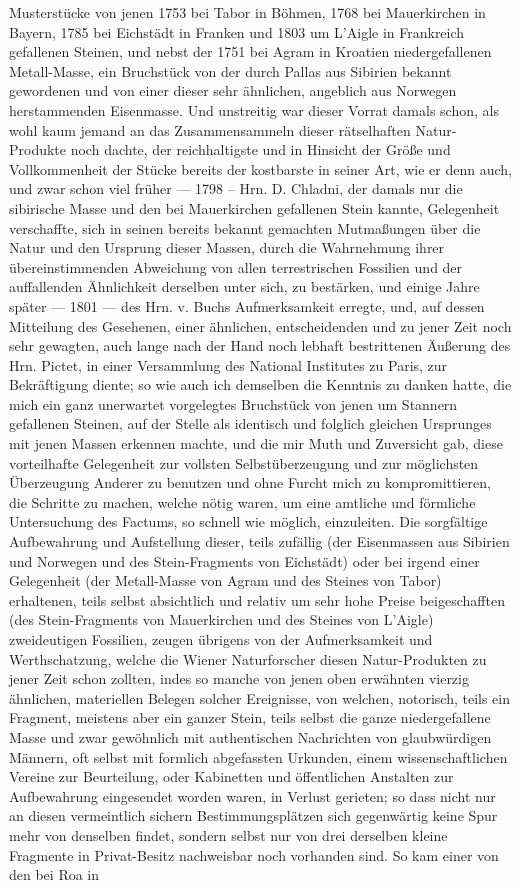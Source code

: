\documentclass[a4paper, 11pt, oneside, german]{article}
\begin{document}
Musterstücke von jenen 1753 bei Tabor in Böhmen, 1768 bei Mauerkirchen in Bayern, 1785 bei Eichstädt in Franken und 1803 um L'Aigle in Frankreich gefallenen Steinen, und nebst der 1751 bei Agram in Kroatien niedergefallenen Metall-Masse, ein Bruchstück von der durch Pallas aus Sibirien bekannt gewordenen und von einer dieser sehr ähnlichen, angeblich aus Norwegen herstammenden Eisenmasse. Und unstreitig war dieser Vorrat damals schon, als wohl kaum jemand an das Zusammensammeln dieser rätselhaften Natur-Produkte noch dachte, der reichhaltigste und in Hinsicht der Größe und Vollkommenheit der Stücke bereits der kostbarste in seiner Art, wie er denn auch, und zwar schon viel früher --- 1798 -- Hrn. D. Chladni, der damals nur die sibirische Masse und den bei Mauerkirchen gefallenen Stein kannte, Gelegenheit verschaffte, sich in seinen bereits bekannt gemachten Mutmaßungen über die Natur und den Ursprung dieser Massen, durch die Wahrnehmung ihrer übereinstimmenden Abweichung von allen terrestrischen Fossilien und der auffallenden Ähnlichkeit derselben unter sich, zu bestärken, und einige Jahre später --- 1801 --- des Hrn. v. Buchs Aufmerksamkeit erregte, und, auf dessen Mitteilung des Gesehenen, einer ähnlichen, entscheidenden und zu jener Zeit noch sehr gewagten, auch lange nach der Hand noch lebhaft bestrittenen Äußerung des Hrn. Pictet, in einer Versammlung des National Institutes zu Paris, zur Bekräftigung diente; so wie auch ich demselben die Kenntnis zu danken hatte, die mich ein ganz unerwartet vorgelegtes Bruchstück von jenen um Stannern gefallenen Steinen, auf der Stelle als identisch und folglich gleichen Ursprunges mit jenen Massen erkennen machte, und die mir Muth und Zuversicht gab, diese vorteilhafte Gelegenheit zur vollsten Selbstüberzeugung und zur möglichsten Überzeugung Anderer zu benutzen und ohne Furcht mich zu kompromittieren, die Schritte zu machen, welche nötig waren, um eine amtliche und förmliche Untersuchung des Factums, so schnell wie möglich, einzuleiten. Die sorgfältige Aufbewahrung und Aufstellung dieser, teils zufällig (der Eisenmassen aus Sibirien und Norwegen und des Stein-Fragments von Eichstädt) oder bei irgend einer Gelegenheit (der Metall-Masse von Agram und des Steines von Tabor) erhaltenen, teils selbst absichtlich und relativ um sehr hohe Preise beigeschafften (des Stein-Fragments von Mauerkirchen und des Steines von L'Aigle) zweideutigen Fossilien, zeugen übrigens von der Aufmerksamkeit und Werthschatzung, welche die Wiener Naturforscher diesen Natur-Produkten zu jener Zeit schon zollten, indes so manche von jenen oben erwähnten vierzig ähnlichen, materiellen Belegen solcher Ereignisse, von welchen, notorisch, teils ein Fragment, meistens aber ein ganzer Stein, teils selbst die ganze niedergefallene Masse und zwar gewöhnlich mit authentischen Nachrichten von glaubwürdigen Männern, oft selbst mit formlich abgefassten Urkunden, einem wissenschaftlichen Vereine zur Beurteilung, oder Kabinetten und öffentlichen Anstalten zur Aufbewahrung eingesendet worden waren, in Verlust gerieten; so dass nicht nur an diesen vermeintlich sichern Bestimmungsplätzen sich gegenwärtig keine Spur mehr von denselben findet, sondern selbst nur von drei derselben kleine Fragmente in Privat-Besitz nachweisbar noch vorhanden sind. So kam einer von den bei Roa in 
\end{document}
